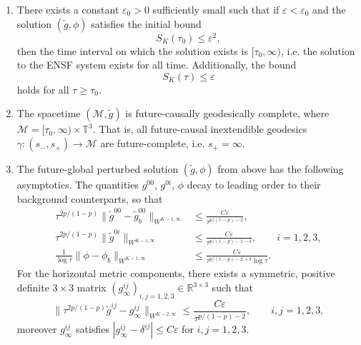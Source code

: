 \documentclass{article}
\newcommand{\RR}{\mathbb{R}}
\newcommand{\TT}{\mathbb{T}}
\newcommand{\mc}{\mathcal}
\newcommand{\wt}{\widetilde}
\newcommand{\ve}{\varepsilon}
\newcommand{\ra}{\rightarrow}
\begin{document}
\begin{theorem}
\begin{enumerate}
        \item There exists a constant $\ve_0 > 0$ sufficiently small such that if $\ve < \ve_0$ and the solution $(\wt{g},\phi)$ satisfies the initial bound
        \begin{equation}\label{sec:gaugedeqs.eq:bounddata}
        S_K(\tau_0) \leq \ve^2,
        \end{equation}
        then the time interval on which the solution exists is $[\tau_0,\infty)$, i.e. the solution to the ENSF system exists for all time. Additionally, the bound
        \begin{equation}
            S_K(\tau) \leq \ve
        \end{equation}
        holds for all $\tau \geq \tau_0$.
        \item The spacetime $(\mc{M},\wt{g})$ is future-causally geodesically complete, where $\mc{M} = [\tau_0,\infty)\times \TT^3$. That is, all future-causal inextendible geodesics $\gamma: (s_-,s_+) \ra \mc{M}$ are future-complete, i.e. $s_+ = \infty$.
        
        \item The future-global perturbed solution $(\wt{g},\phi)$ from above has the following asymptotics. The quantities $g^{00}$, $g^{0i}$, $\phi$ decay to leading order to their background counterparts, so that
        \begin{subequations}\label{sec:globex.eq:asymp}
            \begin{align}
                \tau^{2p/(1-p)}\|\wt{g}^{00} - \wt{g}_b^{00}\|_{W^{K-1,\infty}} &\leq \frac{C\ve}{\tau^{p/(1-p)-2}},\label{sec:globex.eq:asymplapse}\\
                \tau^{2p/(1-p)}\|\wt{g}^{0i}\|_{W^{K-1,\infty}} &\leq \frac{C\ve}{\tau^{p/(1-p) - 1-\delta}},\qquad i=1,2,3,\label{sec:globex.eq:asympshift}\\
                \frac{1}{\log \tau}\|\phi - \phi_b\|_{W^{K-1,\infty}} &\leq \frac{C\ve}{\tau^{p/(1-p)-2+\delta}\log \tau}.\label{sec:globex.eq:asympscalar}
            \end{align}
        \end{subequations}
        For the horizontal metric components, there exists a symmetric, positive definite $3\times 3$ matrix $(g_\infty^{ij})_{i,j=1,2,3} \in \RR^{3\times 3}$ such that
        \begin{equation}
            \|\tau^{2p/(1-p)}\wt{g}^{ij} - g_{\infty}^{ij}\|_{W^{K-2,\infty}} \leq \frac{C\ve}{\tau^{p/(1-p)-2}}, \qquad i,j=1,2,3,\label{sec:globex.eq:asymphori}
        \end{equation}
        moreover $g_\infty^{ij}$ satisfies $|g_\infty^{ij} - \delta^{ij}| \leq C\ve$ for $i,j=1,2,3$.
    \end{enumerate}
\end{theorem}
\end{document}
